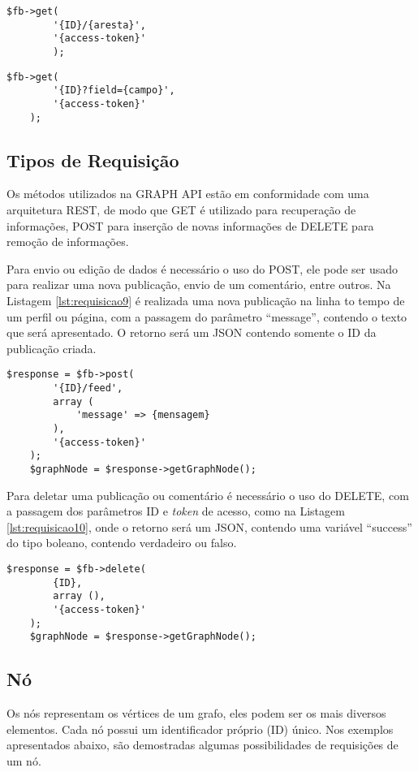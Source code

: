 \begin{lstlisting}[caption={Requisição com o uso do ID+aresta},label={lst:requisicoes2}]
	$fb->get(
    	'{ID}/{aresta}',
    	'{access-token}'
    	);
\end{lstlisting}

\begin{lstlisting}[caption={Requisição com o uso do ID+campo},label={lst:requisicoes3}]
	$fb->get(
		'{ID}?field={campo}',
   		'{access-token}'
   	);
\end{lstlisting}

\subsection{Tipos de Requisição}
Os métodos utilizados na GRAPH API estão em conformidade com uma arquitetura REST, de modo que GET é utilizado para recuperação de informações, POST para inserção de novas informações de DELETE para remoção de informações.

Para envio ou edição de dados é necessário o uso do POST, ele pode ser usado para realizar uma nova publicação, envio de um comentário, entre outros. Na Listagem \ref{lst:requisicao9} é realizada uma nova publicação na linha to tempo de um perfil ou página, com a passagem do parâmetro ``message'', contendo o texto que será apresentado. O retorno será um JSON contendo somente o ID da publicação criada.

\begin{lstlisting}[caption={Requisição POST},label={lst:requisicao9}]
	$response = $fb->post(
   		'{ID}/feed',
    	array (
      		'message' => {mensagem}
    	),
    	'{access-token}'
  	);
	$graphNode = $response->getGraphNode();
\end{lstlisting}

Para deletar uma publicação ou comentário é necessário o uso do DELETE, com a passagem dos parâmetros ID e \textit{token} de acesso, como na Listagem \ref{lst:requisicao10}, onde o retorno será um JSON, contendo uma variável ``success'' do tipo boleano, contendo verdadeiro ou falso.

\begin{lstlisting}[caption={Requisição DELETE},label={lst:requisicao10}]
	$response = $fb->delete(
    	{ID},
   		array (),
    	'{access-token}'
  	);
	$graphNode = $response->getGraphNode();
\end{lstlisting}

\subsection{Nó}
Os nós representam os vértices de um grafo, eles podem ser os mais diversos elementos. Cada nó possui um identificador próprio (ID) único. Nos exemplos apresentados abaixo, são demostradas algumas possibilidades de requisições de um nó.

